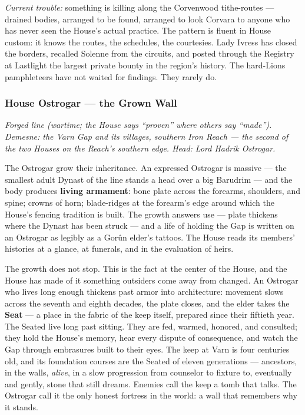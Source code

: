 \textit{Current trouble:} something is killing along the Corvenwood tithe-routes --- drained bodies, arranged to be found, arranged to look Corvara to anyone who has never seen the House's actual practice. The pattern is fluent in House custom: it knows the routes, the schedules, the courtesies. Lady Ivress has closed the borders, recalled Solenne from the circuits, and posted through the Registry at Lastlight the largest private bounty in the region's history. The hard-Lions pamphleteers have not waited for findings. They rarely do.

\subsubsection{House Ostrogar --- the Grown Wall}

\textit{Forged line (wartime; the House says ``proven'' where others say ``made''). Demesne: the Varn Gap and its villages, southern Iron Reach --- the second of the two Houses on the Reach's southern edge. Head: Lord Hadrik Ostrogar.}

The Ostrogar grow their inheritance. An expressed Ostrogar is massive --- the smallest adult Dynast of the line stands a head over a big Barudrim --- and the body produces \textbf{living armament}: bone plate across the forearms, shoulders, and spine; crowns of horn; blade-ridges at the forearm's edge around which the House's fencing tradition is built. The growth answers use --- plate thickens where the Dynast has been struck --- and a life of holding the Gap is written on an Ostrogar as legibly as a Gorûn elder's tattoos. The House reads its members' histories at a glance, at funerals, and in the evaluation of heirs.

The growth does not stop. This is the fact at the center of the House, and the House has made of it something outsiders come away from changed. An Ostrogar who lives long enough thickens past armor into architecture: movement slows across the seventh and eighth decades, the plate closes, and the elder takes the \textbf{Seat} --- a place in the fabric of the keep itself, prepared since their fiftieth year. The Seated live long past sitting. They are fed, warmed, honored, and consulted; they hold the House's memory, hear every dispute of consequence, and watch the Gap through embrasures built to their eyes. The keep at Varn is four centuries old, and its foundation courses are the Seated of eleven generations --- ancestors, in the walls, \textit{alive}, in a slow progression from counselor to fixture to, eventually and gently, stone that still dreams. Enemies call the keep a tomb that talks. The Ostrogar call it the only honest fortress in the world: a wall that remembers why it stands.

